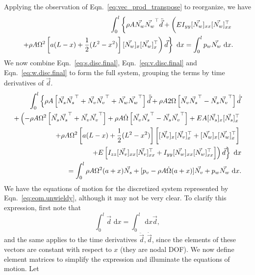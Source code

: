 Applying the observation of Eqn.~\ref{eq:vec_prod_transpose} to reorganize, we have
\begin{eqnarray}
\label{eq:w.disc.final}
\int_0^l\left\lbrace\rho A\vec{N_w}\vec{N_w}^\top\ddot{\vec{d}}+\left(EI_{yy}[\vec{N_w}]_{xx}[\vec{N_w}]_{xx}^\top\vphantom{\frac{0}{0}}\right.\right.  \\
\left.\left.+\rho A\Omega^2\left[a(L-x)+\frac{1}{2}(L^2-x^2)\right][\vec{N_w}]_{x}[\vec{N_w}]_{x}^\top\right)\vec{d}\right\rbrace\text{ d}x 
= \int_0^lp_w\vec{N_w}\text{ d}x. \nonumber 
\end{eqnarray}
We now combine Eqn.~\ref{eq:s.disc.final}, Eqn.~\ref{eq:v.disc.final} and Eqn.~\ref{eq:w.disc.final} to form the full system, grouping the terms by time derivatives of $\vec{d}$.
\begin{eqnarray}
\label{eq:eom.unwieldy}
\int_0^l \left\lbrace\rho A\left[\vec{N_s}\vec{N_s}^\top+\vec{N_v}\vec{N_v}^\top+\vec{N_w}\vec{N_w}^\top\right]\ddot{\vec d}+\rho A2\Omega\left[\vec{N_v}\vec{N_s}^\top-\vec{N_s}\vec{N_v}^\top\right]\dot{\vec{d}}\right. \nonumber \\
\left.+\left(-\rho A\Omega^2\left[\vec{N_s}\vec{N_s}^\top+\vec{N_v}\vec{N_v}^\top\right]+\rho A\dot\Omega \left[\vec{N_v}\vec{N_s}^\top-\vec{N_s}\vec{N_v}^\top\right] +EA[\vec{N_s}]_x[\vec{N_s}]_x^\top\right.\right.\nonumber \\
\left.\left.+\rho A\Omega^2\left[a(L-x)+\frac{1}{2}(L^2-x^2)\right]\left[\vphantom{\frac{0}{0}}[\vec{N_v}]_{x}[\vec{N_v}]_{x}^\top+[\vec{N_w}]_{x}[\vec{N_w}]_{x}^\top\right]\right.\right.\\
\left.\left. +E\left[I_{zz}[\vec{N_v}]_{xx}[\vec{N_v}]_{xx}^\top+I_{yy}[\vec{N_w}]_{xx}[\vec{N_w}]_{xx}^\top\right]\right)\vec{d}\right\rbrace\text{ d}x \nonumber \\
 = \int_0^l \rho A\Omega^2(a+x)\vec{N_s}+[p_v - \rho A\dot\Omega(a+x)]\vec{N_v}+p_w\vec{N_w}\text{ d}x. \nonumber 
\end{eqnarray}
We have the equations of motion for the discretized system represented by Eqn.~\ref{eq:eom.unwieldy}, although it may not be very clear. To clarify this expression, first note that 
\begin{equation}
\int_0^l\vec d\text{ d}x = \int_0^l\text{ d}x\vec d,
\end{equation}
and the same applies to the time derivatives $\ddot{\vec d},\dot{\vec d}$, since the elements of these vectors are constant with respect to $x$ (they are nodal DOF). We now define element matrices to simplify the expression and illuminate the equations of motion. Let
